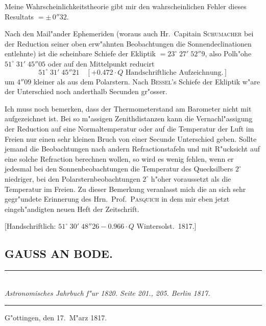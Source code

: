 \documentclass[12pt,a4paper]{article}
\begin{document}
Meine Wahrscheinlichkeitstheorie gibt mir den wahrscheinlichen Fehler dieses Resultats $= \pm\,0''32$.

Nach den Mail"ander Ephemeriden (woraus auch Hr.~Capitain \textsc{Schumacher} bei der Reduction seiner oben
erw"ahnten Beobachtungen die Sonnendeclinationen entlehnte) ist die scheinbare Schiefe der Ekliptik
$= 23^{\circ}\;27'\;52''9$, also Polh"ohe $51^{\circ}\;31'\;45''05$ oder auf den Mittelpunkt reducirt
\[51^{\circ}\;31'\;45''21 \quad [+0.472 \cdot Q \text{ Handschriftliche Aufzeichnung.}]\]
um $4''09$ kleiner als aus dem Polarstern. Nach \textsc{Bessel}'s Schiefe der Ekliptik w"are der Unterschied
noch anderthalb Secunden gr"osser.

Ich muss noch bemerken, dass der Thermometerstand am Barometer nicht mit aufgezeichnet ist.
Bei so m"assigen Zenithdistanzen kann die Vernachl"assigung der Reduction auf eine Normaltemperatur
oder auf die Temperatur der Luft im Freien nur einen sehr kleinen Bruch von einer Secunde Unterschied
geben. Sollte jemand die Beobachtungen nach andern Refractionstafeln und mit R"ucksicht auf eine solche
Refraction berechnen wollen, so wird es wenig fehlen, wenn er jedesmal bei den Sonnenbeobachtungen
die Temperatur des Quecksilbers $2^{\circ}$ niedriger, bei den Polarsternbeobachtungen $2^{\circ}$ h"oher voraussetzt
als die Temperatur im Freien. Zu dieser Bemerkung veranlasst mich die an sich sehr gegr"undete Erinnerung
des Hrn.~Prof.~\textsc{Pasquich} in dem mir eben jetzt eingeh"andigten neuen Heft der Zeitschrift.

\hspace{\fill}[Handschriftlich: $51^{\circ}\;30'\;48''26 - 0.966 \cdot Q$ Wintersolst.~1817.]

\newpage

\subsection*{GAUSS AN BODE.}

\begin{center}
\rule{0.6\textwidth}{0.4pt}\\[0.5em]
\textit{Astronomisches Jahrbuch f"ur 1820. Seite 201., 205. Berlin 1817.}\\[0.3em]
\rule{0.6\textwidth}{0.4pt}
\end{center}

\begin{flushright}
G"ottingen, den 17.~M"arz 1817.
\end{flushright}
\end{document}
